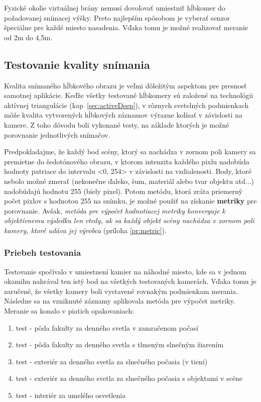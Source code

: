 Fyzické okolie virtuálnej brány nemusí dovoľovať umiestniť hĺbkomer do požadovanej snímacej výšky. Preto najlepším spôsobom je vyberať senzor špeciálne pre každé miesto nasadenia. Vďaka tomu je možné realizovať meranie od 2m do 4,5m.


\subsection{Testovanie kvality snímania}
Kvalita snímaného hĺbkového obrazu je veľmi dôležitým aspektom pre presnosť samotnej aplikácie. Keďže všetky testované hĺbkomery sú založené na technológii aktívnej triangulácie (kap~\ref{sec:activeDeep}), v rôznych svetelných podmienkach môže kvalita vytvorených hĺbkových záznamov výrazne kolísať v závislosti na kamere. Z toho dôvodu boli vykonané testy, na základe ktorých je možné porovnanie jednotlivých snímačov. 

Predpokladajme, že každý bod scény, ktorý sa nachádza v zornom poli kamery sa premietne do šedotónového obrazu, v ktorom intenzita každého pixlu nadobúda hodnoty patriace do intervalu <0, 254> v závislosti na vzdialenosti. Body, ktoré nebolo možné zmerať (nekonečne ďaleko, šum, materiál alebo tvar objektu atd...) nadobúdajú hodnotu 255 (biely pixel). Potom metódu, ktorá zráta priemerný počet pixlov s hodnotou 255 na snímku, je možné použiť na získanie \textbf{metriky} pre porovnanie. Avšak, \textit{metóda pre výpočet hodnotiacej metriky konverguje k objektívnemu výsledku len vtedy, ak sa každý objekt scény nachádza v zornom poli kamery, ktoré udáva jej výrobca} (príloha \ref{pr:metric}). 

\subsubsection{Priebeh testovania}
Testovanie spočívalo v umiestnení kamier na náhodné miesto, kde sa v jednom okamihu nahrával ten istý bod na všetkých testovaných kamerách. Vďaka tomu je zaručené, že všetky kamery boli vystavené rovnakým podmienkam merania. Následne sa na vzniknuté záznamy aplikovala metóda pre výpočet metriky. Meranie sa konalo v piatich opakovaniach: 

\begin{enumerate}
\item test - pôda fakulty za denného svetla v zamračenom počasí
\item test - pôda fakulty za denného svetla s tlmeným slnečným žiarením
\item test - exteriér za denného svetla za slnečného počasia (v tieni)
\item test - exteriér za denného svetla za slnečného počasia s objektami v scéne
\item test - interiér za umelého osvetlenia
\end{enumerate}


